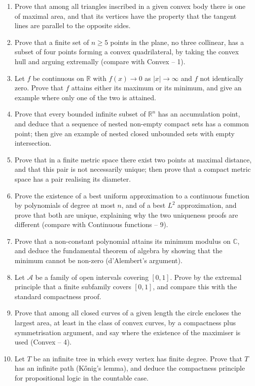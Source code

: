 \documentclass[11pt,a4paper]{article}
\renewcommand{\ge}{\geqslant}
\begin{document}
\begin{enumerate}[itemsep=0.4em,topsep=7.4pt]
\item Prove that among all triangles inscribed in a given convex body there is one of maximal
area, and that its vertices have the property that the tangent lines are parallel to the opposite
sides.

\item Prove that a finite set of $n\ge5$ points in the plane, no three collinear, has a
subset of four points forming a convex quadrilateral, by taking the convex hull and arguing
extremally (compare with Convex -- 1).

\item Let $f$ be continuous on $\mathbb R$ with $f(x)\to0$ as $|x|\to\infty$ and $f$ not
identically zero. Prove that $f$ attains either its maximum or its minimum, and give an example
where only one of the two is attained.

\item Prove that every bounded infinite subset of $\mathbb R^n$ has an accumulation point, and
deduce that a sequence of nested non-empty compact sets has a common point; then give an example
of nested closed unbounded sets with empty intersection.

\item Prove that in a finite metric space there exist two points at maximal distance, and that
this pair is not necessarily unique; then prove that a compact metric space has a pair realising
its diameter.

\item Prove the existence of a best uniform approximation to a continuous function by polynomials
of degree at most $n$, and of a best $L^2$ approximation, and prove that both are unique,
explaining why the two uniqueness proofs are different (compare with Continuous functions -- 9).

\item Prove that a non-constant polynomial attains its minimum modulus on $\mathbb C$, and deduce
the fundamental theorem of algebra by showing that the minimum cannot be non-zero (d'Alembert's
argument).

\item Let $\mathcal A$ be a family of open intervals covering $[0,1]$. Prove by the extremal
principle that a finite subfamily covers $[0,1]$, and compare this with the standard compactness
proof.

\item Prove that among all closed curves of a given length the circle encloses the largest area,
at least in the class of convex curves, by a compactness plus symmetrisation argument, and say
where the existence of the maximiser is used (Convex -- 4).

\item Let $T$ be an infinite tree in which every vertex has finite degree. Prove that $T$ has an
infinite path (K\H{o}nig's lemma), and deduce the compactness principle for propositional logic
in the countable case.
\end{enumerate}
\end{document}
